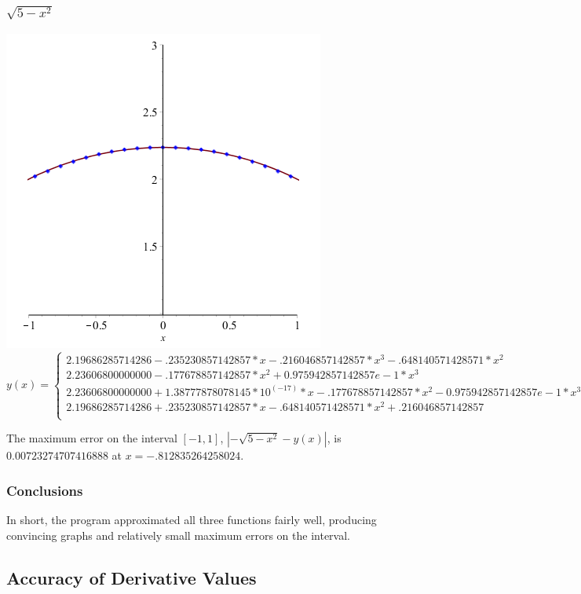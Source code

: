 \documentclass[11pt]{article} %
\begin{document}
\subsubsection*{$\sqrt{5-x^2}$}
\includegraphics[scale=.3]{plots/dataset4approx.png}
$$
y(x) = \left\{
        \begin{array}{ll}
            2.19686285714286-.235230857142857*x-.216046857142857*x^3-.648140571428571*x^2 &  x < -.5 \\
           2.23606800000000-.177678857142857*x^2+0.975942857142857e-1*x^3 & x < 0 \\
 	2.23606800000000+1.38777878078145*10^(-17)*x-.177678857142857*x^2-0.975942857142857e-1*x^3 &  x < 0.5 \\
 	2.19686285714286+.235230857142857*x-.648140571428571*x^2+.216046857142857 &  x \geq .5 \\
        \end{array}
    \right.
$$

The maximum error on the interval $[-1,1]$, $|-\sqrt{5-x^2} - y(x)|$, is $0.00723274707416888$ at $x = -.812835264258024$.

\subsubsection*{Conclusions}
\par In short, the program approximated all three functions fairly well, producing convincing graphs and relatively small maximum errors on the interval.
\subsection*{Accuracy of Derivative Values}
\end{document}
